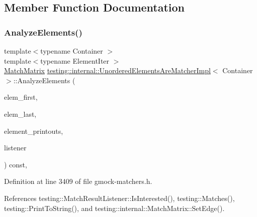 \subsection{Member Function Documentation}
\mbox{\label{classtesting_1_1internal_1_1UnorderedElementsAreMatcherImpl_a327b473a760be4b4e0b3495b4e15a7e8}} 
\subsubsection{\texorpdfstring{Analyze\+Elements()}{AnalyzeElements()}}
{\footnotesize\ttfamily template$<$typename Container $>$ \\
template$<$typename Element\+Iter $>$ \\
\hyperlink{classtesting_1_1internal_1_1MatchMatrix}{Match\+Matrix} \hyperlink{classtesting_1_1internal_1_1UnorderedElementsAreMatcherImpl}{testing\+::internal\+::\+Unordered\+Elements\+Are\+Matcher\+Impl}$<$ Container $>$\+::Analyze\+Elements (\begin{DoxyParamCaption}\item[{Element\+Iter}]{elem\+\_\+first,  }\item[{Element\+Iter}]{elem\+\_\+last,  }\item[{\+::std\+::vector$<$ \hyperlink{namespacetesting_1_1internal_a8e8ff5b11e64078831112677156cb111}{string} $>$ $\ast$}]{element\+\_\+printouts,  }\item[{\hyperlink{classtesting_1_1MatchResultListener}{Match\+Result\+Listener} $\ast$}]{listener }\end{DoxyParamCaption}) const\hspace{0.3cm}{\ttfamily [inline]}, {\ttfamily [private]}}



Definition at line 3409 of file gmock-\/matchers.\+h.



References testing\+::\+Match\+Result\+Listener\+::\+Is\+Interested(), testing\+::\+Matches(), testing\+::\+Print\+To\+String(), and testing\+::internal\+::\+Match\+Matrix\+::\+Set\+Edge().


